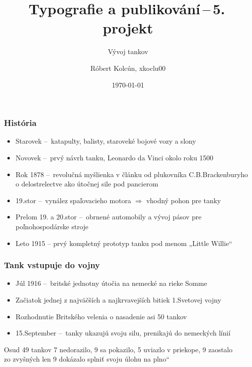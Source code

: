 \documentclass{beamer}
\author{Róbert Kolcún, xkoclu00}
\title{Typografie a publikování\,--\,5.\,projekt}
\subtitle{Vývoj tankov}
\institute{VUT v~Brně \\FIT}
\date{\today}
\providecommand{\uv}[1]{\quotedblbase #1\textquotedblleft}
\begin{document}
	\begin{frame}
		\maketitle
	\end{frame}
	
	\begin{frame}
		\frametitle{História}
		\begin{itemize}
			\item Starovek --\ katapulty, balisty, staroveké bojové vozy a slony
			\item Novovek --\ prvý návrh tanku, Leonardo da Vinci okolo roku 1500
			\item Rok 1878 --\ revolučná myšlienka v článku od plukovníka C.B.Brackenburyho o delostrelectve ako útočnej sile pod pancierom
			\item 19.stor --\ vynález spaľovacieho motora $\Rightarrow$ vhodný pohon pre tanky
			\item Prelom 19. a 20.stor --\ obrnené automobily a vývoj pásov pre poľnohospodárske stroje
			\item Leto 1915 – prvý kompletný prototyp tanku pod menom „Little Willie“
		\end{itemize}
	\end{frame}
	
	
	
	\begin{frame}
		\frametitle{Tank vstupuje do vojny}
		\begin{itemize}
			\item Júl 1916 --\ britské jednotny útočia na nemecké na rieke Somme
			\item Začiatok jednej z najväčších a najkrvavejších bitiek 1.Svetovej vojny
			\item Rozhodnutie Britského velenia o nasadenie asi 50 tankov
			\item 15.September --\ tanky ukazujú svoju silu, prenikajú do nemeckých línií
		\end{itemize}
		
		\begin{block}{Osud 49 tankov}
			7 nedorazilo, 9 sa pokazilo, 5 uviazlo v priekope, 9 zaostalo \\ zo zvyšných len 9 dokázalo splniť svoju úlohu \uv{na plno}
		\end{block}
	\end{frame}
	
	
	
\end{document}
